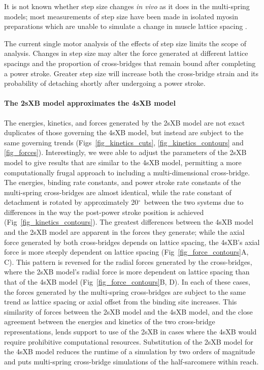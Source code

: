 \documentclass[10pt]{article}
\newcommand{\citep}[1]{\cite{#1}} %
\newcommand{\de}{$^\circ$} %
\begin{document}
It is not known whether step size changes \textit{in vivo} as it does in the multi-spring models; most measurements of step size have been made in isolated myosin preparations which are unable to simulate a change in muscle lattice spacing \citep{HowardBook, Peterman2004}. 

The current single motor analysis of the effects of step size limits the scope of analysis.
Changes in step size may alter the force generated at different lattice spacings and the proportion of cross-bridges that remain bound after completing a power stroke. 
Greater step size will increase both the cross-bridge strain and its probability of detaching shortly after undergoing a power stroke. 

\paragraph*{The 2sXB model approximates the 4sXB model} %
The energies, kinetics, and forces generated by the 2sXB model are not exact duplicates of those governing the 4sXB model, but instead are subject to the same governing trends (Figs~\ref{fig_kinetics_cuts}, \ref{fig_kinetics_contours} and \ref{fig_forces}). 
Interestingly, we were able to adjust the parameters of the 2sXB model to give results that are similar to the 4sXB model, permitting a more computationally frugal approach to including a multi-dimensional cross-bridge.
The energies, binding rate constants, and power stroke rate constants of the multi-spring cross-bridges are almost identical, while the rate constant of detachment is rotated by approximately 20\de~between the two systems due to differences in the way the post-power stroke position is achieved (Fig~\ref{fig_kinetics_contours}).
The greatest differences between the 4sXB model and the 2sXB model are apparent in the forces they generate; while the axial force generated by both cross-bridges depends on lattice spacing, the 4sXB's axial force is more steeply dependent on lattice spacing (Fig~\ref{fig_force_contours}A, C). 
This pattern is reversed for the radial forces generated by the cross-bridges, where the 2sXB model's radial force is more dependent on lattice spacing than that of the 4sXB model (Fig~\ref{fig_force_contours}B, D).  
In each of these cases, the forces generated by the multi-spring cross-bridges are subject to the same trend as lattice spacing or axial offset from the binding site increases.
This similarity of forces between the 2sXB model and the 4sXB model, and the close agreement between the energies and kinetics of the two cross-bridge representations, lends support to use of the 2sXB in cases where the 4sXB would require prohibitive computational resources.
Substitution of the 2sXB model for the 4sXB model reduces the runtime of a simulation by two orders of magnitude and puts multi-spring cross-bridge simulations of the half-sarcomere within reach.
\end{document}
